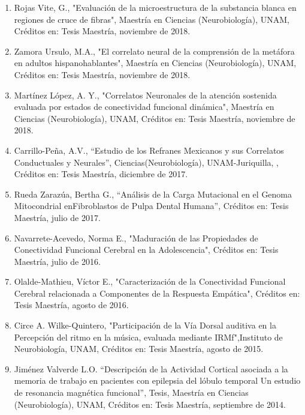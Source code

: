 \begin{enumerate}
\item Rojas Vite, G., "Evaluación de la microestructura de la substancia blanca en regiones de cruce de fibras", Maestría 
en 
Ciencias (Neurobiología), UNAM, Créditos en: Tesis Maestría, noviembre de 2018.

\item Zamora Ursulo, M.A., "El correlato neural de la comprensión de la metáfora en adultos hispanohablantes", Maestría en 
Ciencias (Neurobiología), UNAM, Créditos en: Tesis Maestría, noviembre de 2018.

\item Martínez López, A. Y., "Correlatos Neuronales de la atención sostenida evaluada por estados de conectividad funcional 
dinámica", Maestría en Ciencias (Neurobiología), UNAM, Créditos en: Tesis Maestría, noviembre de 2018.

\item Carrillo-Peña, A.V., “Estudio de los Refranes Mexicanos y sus Correlatos Conductuales y Neurales”, 
Ciencias(Neurobiología), UNAM-Juriquilla, , Créditos en: Tesis Maestría, diciembre de 2017.

\item Rueda Zarazúa, Bertha G., “Análisis de la Carga Mutacional en el Genoma Mitocondrial enFibroblastos de Pulpa Dental 
Humana”, Créditos en: Tesis Maestría, julio de 2017.

\item Navarrete-Acevedo, Norma E., "Maduración de las Propiedades de Conectividad Funcional Cerebral en la Adolescencia", 
Créditos en: Tesis Maestría, julio de 2016.

\item Olalde-Mathieu, Víctor E., "Caracterización de la Conectividad Funcional Cerebral relacionada a Componentes de la 
Respuesta Empática", Créditos en: Tesis Maestría, agosto de 2016.

\item Circe A. Wilke-Quintero, "Participación de la Vía Dorsal auditiva en la Percepción del ritmo en la música, evaluada 
mediante IRMf",Instituto de Neurobiología, UNAM, Créditos en: Tesis Maestría, agosto de 2015.

\item Jiménez Valverde L.O. “Descripción de la Actividad Cortical asociada a la memoria de trabajo en pacientes con 
epilepsia 
del lóbulo temporal Un estudio de resonancia magnética funcional”, Tesis, Maestría en Ciencias (Neurobiología), UNAM, 
Créditos en: Tesis Maestría, septiembre de 2014.


\end{enumerate}

